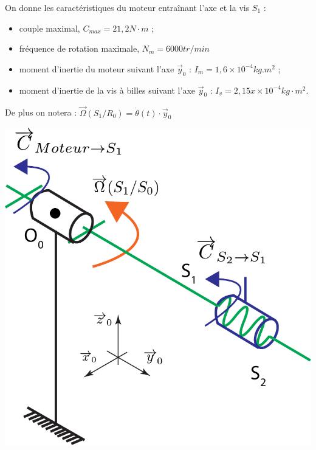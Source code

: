 \documentclass[10pt,fleqn]{article} %
\begin{document}
\begin{multicols}{2}
\begin{exemple}
\begin{minipage}{0.5\textwidth}
On donne les caractéristiques du moteur entraînant l'axe et la vis $S_1$ :
\begin{itemize}
\item couple maximal, $C_{max} = 21,2 N\cdot m$ ;
\item fréquence de rotation maximale, $N_m = 6000 tr/min$
\item moment d'inertie du moteur suivant l'axe $\overrightarrow{y}_0$ : $I_m = 1,6 \times 10^{-4} kg.m^2$ ;
\item moment d'inertie de la vis à billes suivant l'axe $\overrightarrow{y}_0$ : $I_v = 2,15 x\times 10^{-4} kg\cdot m^2$.
\end{itemize}
De plus on notera : $\overrightarrow{\Omega}(S_1/R_0)=\dot{\theta}(t)\cdot \overrightarrow{y}_0$
\end{minipage}
\begin{minipage}{0.45\textwidth}
\begin{center}
\includegraphics[width=1.0\textwidth]{images/schema_cine_depose_rotation.pdf}
\end{center}
\end{minipage}


\end{exemple}
\end{multicols}
\end{document}
